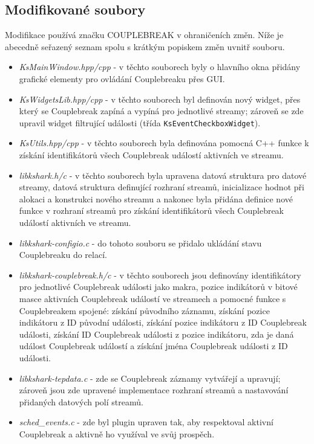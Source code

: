 \subsection{Modifikované soubory}
Modifikace používá značku COUPLEBREAK v ohraničeních změn. Níže je abecedně seřazený seznam spolu s krátkým popiskem změn uvnitř souboru.
\begin{itemize}
    \item \emph{KsMainWindow.hpp/cpp} - v těchto souborech byly o hlavního okna přidány grafické elementy pro ovládání Couplebreaku přes GUI.
    \item \emph{KsWidgetsLib.hpp/cpp} - v těchto souborech byl definován nový widget, přes který se Couplebreak zapíná a vypíná pro jednotlivé streamy; zároveň se zde upravil widget filtrující události (třída \verb|KsEventCheckboxWidget|).
    \item \emph{KsUtils.hpp/cpp} - v těchto souborech byla definována pomocná C++ funkce k získání identifikátorů všech Couplebreak událostí aktivních ve streamu.
    \item \emph{libkshark.h/c} - v těchto souborech byla upravena datová struktura pro datové streamy, datová struktura definující rozhraní streamů, inicializace hodnot při alokaci a konstrukci nového streamu a nakonec byla přidána definice nové funkce v rozhraní streamů pro získání identifikátorů všech Couplebreak událostí aktivních ve streamu.
    \item \emph{libkshark-configio.c} - do tohoto souboru se přidalo ukládání stavu Couplebreaku do relací.
    \item \emph{libkshark-couplebreak.h/c} - v těchto souborech jsou definovány identifikátory pro jednotlivé Couplebreak události jako makra, pozice indikátorů v bitové masce aktivních Couplebreak událostí ve streamech a pomocné funkce s Couplebreakem spojené: získání původního záznamu, získání pozice indikátoru z ID původní události, získání pozice indikátoru z ID Couplebreak události, získání ID Couplebreak události z pozice indikátoru, zda je daná událost Couplebreak událostí a získání jména Couplebreak události z ID události.
    \item \emph{libkshark-tepdata.c} - zde se Couplebreak záznamy vytvářejí a upravují; zároveň jsou zde upravené implementace rozhraní streamů a nastavování přidaných datových polí streamů.
    \item \emph{sched\_events.c} - zde byl plugin upraven tak, aby respektoval aktivní Couplebreak a aktivně ho využíval ve svůj prospěch.
\end{itemize}

